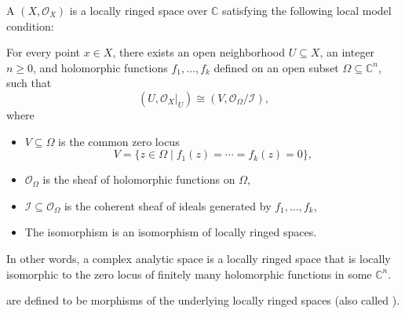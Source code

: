 \begin{definition} \label{definition:complex_analytic_space}
A  $(X, \mathcal{O}_X)$ is a locally ringed space over $\mathbb{C}$ satisfying the following local model condition:

For every point $x \in X$, there exists an open neighborhood $U \subseteq X$, an integer $n \geq 0$, 
and holomorphic functions $f_1, \dots, f_k$ defined on an open subset $\Omega \subseteq \mathbb{C}^n$, such that
$$(U, \mathcal{O}_X|_U) \cong (V, \mathcal{O}_{\Omega}/\mathcal{I}),$$
where
\begin{itemize}
    \item $V \subseteq \Omega$ is the common zero locus
    $$V = \{ z \in \Omega \mid f_1(z) = \cdots = f_k(z) = 0 \},$$
    \item $\mathcal{O}_{\Omega}$ is the sheaf of holomorphic functions on $\Omega$,
    \item $\mathcal{I} \subseteq \mathcal{O}_{\Omega}$ is the coherent sheaf of ideals generated by $f_1, \dots, f_k$,
    \item The isomorphism is an isomorphism of locally ringed spaces.
\end{itemize}

In other words, a complex analytic space is a locally ringed space that is locally isomorphic to the zero locus of finitely many holomorphic functions in some $\mathbb{C}^n$.

\smallskip

 are defined to be morphisms of the underlying locally ringed spaces (also called ).

\end{definition}
